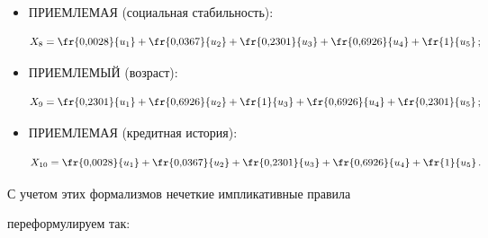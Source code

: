 \begin{itemize}
$$

X_7= \fr{0{,}0028}{u_1} 

+\fr{0{,}0367}{u_2}+\fr{0{,}2301}{u_3}+\fr{0{,}6926}{u_4}+\fr{1}{u_5}\,;

$$

\item ПРИЕМЛЕМАЯ (социальная стабильность): 

$$

X_8= \fr{0{,}0028}{u_1} 

+\fr{0{,}0367}{u_2}+\fr{0{,}2301}{u_3}+\fr{0{,}6926}{u_4}+\fr{1}{u_5}\,;

$$

\item ПРИЕМЛЕМЫЙ (возраст): 

$$

X_9= \fr{0{,}2301}{u_1} 

+\fr{0{,}6926}{u_2}+\fr{1}{u_3}+\fr{0{,}6926}{u_4}+\fr{0{,}2301}{u_5}\,;

$$



\item ПРИЕМЛЕМАЯ (кредитная история): 

$$

X_{10}= \fr{0{,}0028}{u_1} 

+\fr{0{,}0367}{u_2}+\fr{0{,}2301}{u_3}+\fr{0{,}6926}{u_4}+\fr{1}{u_5}\,.

$$

\end{itemize}



  С учетом этих формализмов нечеткие импликативные правила 

переформулируем так:

